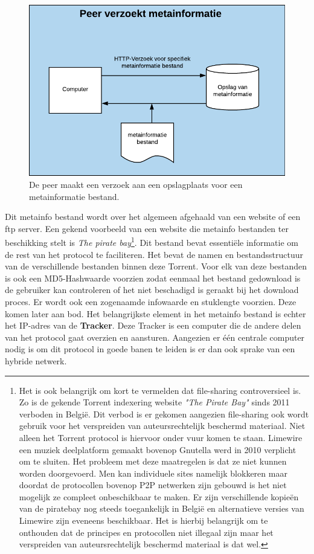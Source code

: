 \begin{figure}[h!]
\centering
\includegraphics[scale=.4]{torrent-1.png}
\caption[Peer metainformatie stap  - Torrenting 1]{De peer maakt een verzoek aan een opslagplaats voor een metainformatie bestand.}
\end{figure}

Dit metainfo bestand wordt over het algemeen afgehaald van een website of een ftp server. Een gekend voorbeeld van een website die metainfo bestanden ter beschikking stelt is \textit{The pirate bay}\footnote{Het is ook belangrijk om kort te vermelden dat file-sharing controversieel is. Zo is de gekende Torrent indexering website \textit{"The Pirate Bay"} sinds 2011 verboden in België. Dit verbod is er gekomen aangezien file-sharing ook wordt gebruik voor het verspreiden van auteursrechtelijk beschermd materiaal. Niet alleen het Torrent protocol is hiervoor onder vuur komen te staan. Limewire een muziek deelplatform gemaakt bovenop Gnutella werd in 2010 verplicht om te sluiten. Het probleem met deze maatregelen is dat ze niet kunnen worden doorgevoerd. Men kan individuele sites namelijk  blokkeren maar doordat de protocollen bovenop P2P netwerken zijn gebouwd is het niet mogelijk ze compleet onbeschikbaar te maken. Er zijn verschillende kopieën van de piratebay nog steeds toegankelijk in België en alternatieve versies van Limewire zijn eveneens beschikbaar. Het is hierbij belangrijk om te onthouden dat de principes en protocollen niet illegaal zijn maar het verspreiden van auteursrechtelijk beschermd materiaal is dat wel.}. Dit bestand bevat essentiële informatie om de rest van het protocol te faciliteren. Het bevat de namen en bestandsstructuur van de verschillende bestanden binnen deze Torrent. Voor elk van deze bestanden is ook een MD5-Hashwaarde voorzien zodat eenmaal het bestand gedownload is de gebruiker kan controleren of het niet beschadigd is geraakt bij het download proces. Er wordt ook een zogenaamde infowaarde en stuklengte voorzien. Deze komen later aan bod. Het belangrijkste element in het metainfo bestand is echter het IP-adres van de \textbf{Tracker}. Deze Tracker is een computer die de andere delen van het protocol gaat overzien en aansturen. Aangezien er één centrale computer nodig is om dit protocol in goede banen te leiden is er dan ook sprake van een hybride netwerk.\\

